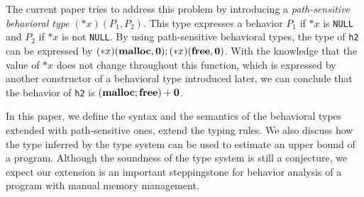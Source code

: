 The current paper tries to address this problem by introducing a
\emph{path-sensitive behavioral type} $(*x)(P_1, P_2)$.  This type
expresses a behavior $P_1$ if $*x$ is
\verb|NULL| and $P_2$ if $*x$ is not \verb|NULL|.  By using
path-sensitive behavioral types, the type of \verb|h2| can be expressed
by $(*x)(\mathbf{malloc}, \mathbf{0}); (*x)(\mathbf{free}, \mathbf{0})$.  With the knowledge
that the value of $*x$ does not change throughout this function, which
is expressed by another constructor of a behavioral type introduced
later, we can conclude that the behavior of \verb|h2| is $(\mathbf{malloc};
\mathbf{free}) + \mathbf{0}$.

In this paper, we define the syntax and the semantics of the behavioral
types extended with path-sensitive ones, extend the typing rules.  We
also discuss how the type inferred by the type system can be used to
estimate an upper bound of a program.  Although the soundness of the
type system is still a conjecture, we expect our extension is an
important steppingstone for behavior analysis of a program with manual
memory management.







